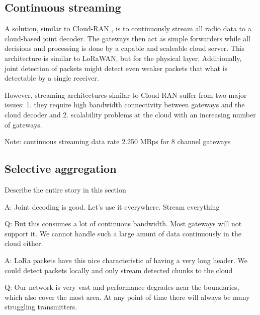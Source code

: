 \subsection{Continuous streaming}
\label{sec:continuus-streaming}

A solution, similar to Cloud-RAN \cite{chen2011c}, is to continuously
stream all radio data to a cloud-based joint decoder. The gateways then act as
simple forwarders while all decisions and processing is done by a capable and
scaleable cloud server. This architecture is similar to LoRaWAN, but for the
physical layer. Additionally, joint detection of packets might detect even
weaker packets that what is detectable by a single receiver.

However, streaming architectures similar to Cloud-RAN suffer from two major
issues: 1. they require high bandwidth connectivity between gateways and the
cloud decoder and 2. scalability problems at the cloud with an increasing
number of gateways.

Note: continuous streaming data rate 2.250 MBps for 8 channel gateways

\subsection{Selective aggregation}
\label{sec:selective-aggregation}

{\color{blue} Describe the entire story in this section}

A: Joint decoding is good. Let's use it everywhere. Stream everything

Q: But this consumes a lot of continuous bandwidth. Most gateways will not support it. We cannot handle such a large amunt of data continuously in the cloud either.

A: LoRa packets have this nice characteristic of having a very long header. We could detect packets locally and only stream detected chunks to the cloud

Q: Our network is very vast and performance degrades near the boundaries, which also cover the most area. At any point of time there will always be many struggling transmitters.
